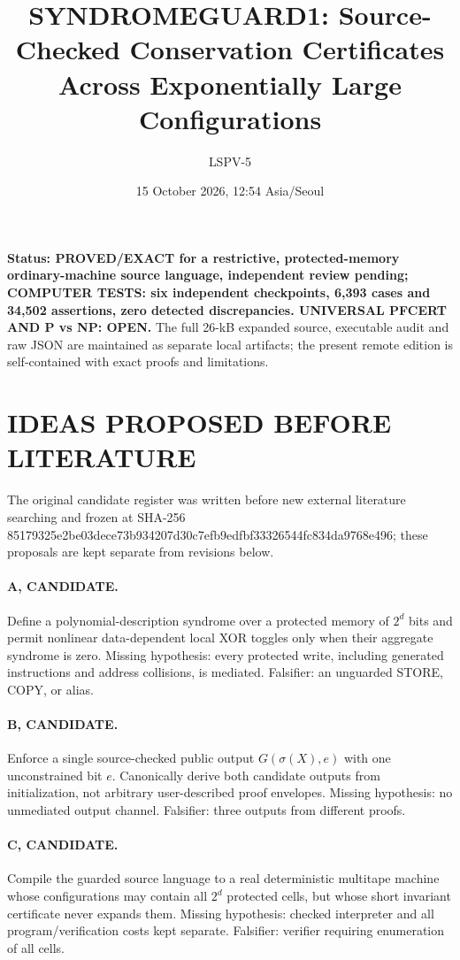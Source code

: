 \documentclass[11pt]{article}
\title{SYNDROMEGUARD1: Source-Checked Conservation Certificates Across Exponentially Large Configurations}
\author{LSPV-5}
\date{15 October 2026, 12:54 Asia/Seoul}
\begin{document}
\maketitle
\noindent\textbf{Status: PROVED/EXACT for a restrictive, protected-memory ordinary-machine source language, independent review pending; COMPUTER TESTS: six independent checkpoints, 6,393 cases and 34,502 assertions, zero detected discrepancies. UNIVERSAL PFCERT AND P vs NP: OPEN.}
The full 26-kB expanded source, executable audit and raw JSON are maintained as separate local artifacts; the present remote edition is self-contained with exact proofs and limitations.

\section{IDEAS PROPOSED BEFORE LITERATURE}
The original candidate register was written before new external literature searching and frozen at SHA-256 85179325e2be03dece73b934207d30c7efb9edfbf33326544fc834da9768e496; these proposals are kept separate from revisions below.

\paragraph{A, CANDIDATE.} Define a polynomial-description syndrome over a protected memory of $2^d$ bits and permit nonlinear data-dependent local XOR toggles only when their aggregate syndrome is zero. Missing hypothesis: every protected write, including generated instructions and address collisions, is mediated. Falsifier: an unguarded STORE, COPY, or alias.

\paragraph{B, CANDIDATE.} Enforce a single source-checked public output $G(\sigma(X),e)$ with one unconstrained bit $e$. Canonically derive both candidate outputs from initialization, not arbitrary user-described proof envelopes. Missing hypothesis: no unmediated output channel. Falsifier: three outputs from different proofs.

\paragraph{C, CANDIDATE.} Compile the guarded source language to a real deterministic multitape machine whose configurations may contain all $2^d$ protected cells, but whose short invariant certificate never expands them. Missing hypothesis: checked interpreter and all program/verification costs kept separate. Falsifier: verifier requiring enumeration of all cells.
\end{document}

